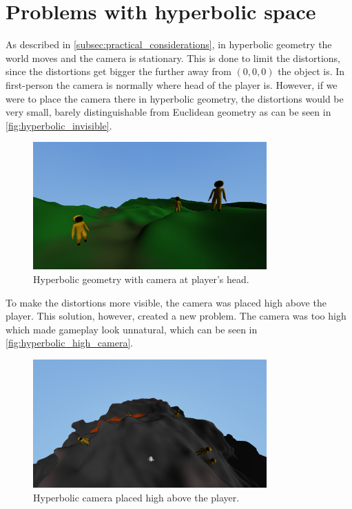 \section{Problems with hyperbolic space} \label{sec:hyperbolic_problems}
As described in \autoref{subsec:practical_considerations}, in hyperbolic geometry the world moves and the camera is stationary.
This is done to limit the distortions, since the distortions get bigger the further away from $(0,0,0)$ the object is.
In first-person the camera is normally where head of the player is.
However, if we were to place the camera there in hyperbolic geometry, the distortions would be very small, barely distinguishable from Euclidean geometry as can be seen in \autoref{fig:hyperbolic_invisible}.

\begin{figure}[H]
    \centering
    \includegraphics[width=0.8\textwidth]{chapters/problems/resources/hyperbolic-invisible.png}
    \caption{Hyperbolic geometry with camera at player's head.}
    \label{fig:hyperbolic_invisible}
\end{figure}

To make the distortions more visible, the camera was placed high above the player.
This solution, however, created a new problem.
The camera was too high which made gameplay look unnatural, which can be seen in \autoref{fig:hyperbolic_high_camera}.

\begin{figure}[H]
    \centering
    \includegraphics[width=0.8\textwidth]{chapters/problems/resources/hyperbolic-high-camera.png}
    \caption{Hyperbolic camera placed high above the player.}
    \label{fig:hyperbolic_high_camera}
\end{figure}

